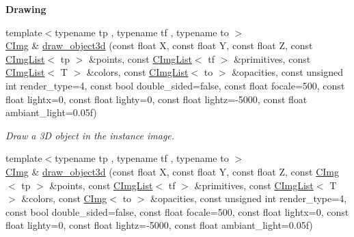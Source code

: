 \begin{Indent}{\bf Drawing}
\begin{DoxyCompactItemize}
{{\footnotesize template$<$typename tp , typename tf , typename to $>$ }\\\hyperlink{structcimg__library_1_1_c_img}{CImg} \& \hyperlink{structcimg__library_1_1_c_img_a0770db2fa6bab28f0fe1cdb7bb397a0a}{draw\_\-object3d} (const float X, const float Y, const float Z, const \hyperlink{structcimg__library_1_1_c_img_list}{CImgList}$<$ tp $>$ \&points, const \hyperlink{structcimg__library_1_1_c_img_list}{CImgList}$<$ tf $>$ \&primitives, const \hyperlink{structcimg__library_1_1_c_img_list}{CImgList}$<$ T $>$ \&colors, const \hyperlink{structcimg__library_1_1_c_img_list}{CImgList}$<$ to $>$ \&opacities, const unsigned int render\_\-type=4, const bool double\_\-sided=false, const float focale=500, const float lightx=0, const float lighty=0, const float lightz=-\/5000, const float ambiant\_\-light=0.05f)}
\label{structcimg__library_1_1_c_img_a0770db2fa6bab28f0fe1cdb7bb397a0a}

\begin{DoxyCompactList}\small\item\em Draw a 3D object in the instance image. \item\end{DoxyCompactList}\item 
\hypertarget{structcimg__library_1_1_c_img_a30bce7fb9ed1013f5f6ab57ac5996880}{
{\footnotesize template$<$typename tp , typename tf , typename to $>$ }\\\hyperlink{structcimg__library_1_1_c_img}{CImg} \& \hyperlink{structcimg__library_1_1_c_img_a30bce7fb9ed1013f5f6ab57ac5996880}{draw\_\-object3d} (const float X, const float Y, const float Z, const \hyperlink{structcimg__library_1_1_c_img}{CImg}$<$ tp $>$ \&points, const \hyperlink{structcimg__library_1_1_c_img_list}{CImgList}$<$ tf $>$ \&primitives, const \hyperlink{structcimg__library_1_1_c_img_list}{CImgList}$<$ T $>$ \&colors, const \hyperlink{structcimg__library_1_1_c_img}{CImg}$<$ to $>$ \&opacities, const unsigned int render\_\-type=4, const bool double\_\-sided=false, const float focale=500, const float lightx=0, const float lighty=0, const float lightz=-\/5000, const float ambiant\_\-light=0.05f)}
\label{structcimg__library_1_1_c_img_a30bce7fb9ed1013f5f6ab57ac5996880}


\end{DoxyCompactItemize}
\end{Indent}
